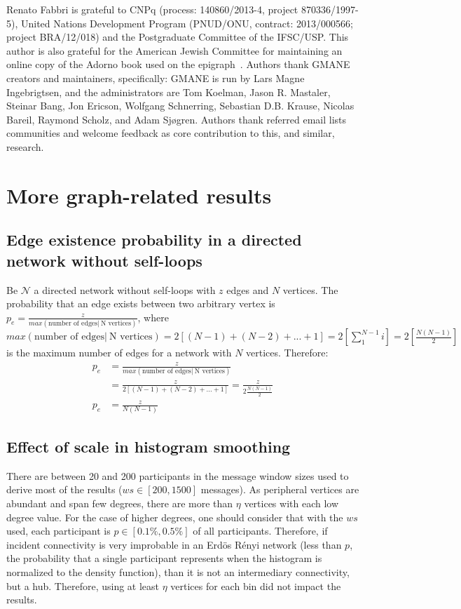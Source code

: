 \documentclass[%
 aip,
 jmp,%
 amsmath,amssymb,
 reprint,%
]{revtex4-1}
\begin{document}
\begin{acknowledgments}
Renato Fabbri is grateful to CNPq (process: 140860/2013-4,
project 870336/1997-5), United Nations Development Program (PNUD/ONU, contract: 2013/000566; project BRA/12/018)  and 
the Postgraduate Committee of the IFSC/USP. This author is also grateful for
the American Jewish Committee for maintaining an online copy of the Adorno book
used on the epigraph~\cite{adorno}. Authors thank GMANE creators and maintainers, specifically: GMANE is run by Lars Magne Ingebrigtsen, and the administrators are Tom Koelman, Jason R. Mastaler, Steinar Bang, Jon Ericson, Wolfgang Schnerring, Sebastian D.B. Krause, Nicolas Bareil, Raymond Scholz, and Adam Sjøgren. Authors thank referred email lists communities and welcome feedback as core contribution to this, and similar, research.
\end{acknowledgments}


\appendix
\section{More graph-related results}
\subsection{Edge existence probability in a directed network without self-loops}\label{ap:ded}
Be $\mathcal{N}$ a directed network without self-loops with $z$ edges and $N$ vertices. The probability that an edge exists between two arbitrary vertex is $p_e=\frac{z}{max( \text{number of edges} |\ \text{N vertices})}$, where $max( \text{number of edges} |\ \text{N vertices})=2[(N-1)+(N-2)+...+1]=2[\sum_1^{N-1}i]=2[\frac{N(N-1)}{2}]$ is the maximum number of edges for a network with $N$ vertices. Therefore:
\begin{align}
    p_e&=\frac{z}{max( \text{number of edges} |\ \text{N vertices})} \nonumber \\
       &=\frac{z}{2[(N-1)+(N-2)+...+1]}=\frac{z}{2\frac{N(N-1)}{2}} \nonumber \\
   p_e &=\frac{z}{N(N-1)}
\end{align}

\subsection{Effect of scale in histogram smoothing}\label{ap:ded}
There are between 20 and 200 participants in the message window sizes used to derive most of the results ($ws \in [200,1500]$ messages). As peripheral vertices are abundant and span few degrees, there are more than $\eta$ vertices with each low degree value. For the case of higher degrees, one should consider that with the $ws$ used, each participant is $p \in [0.1\%,0.5\%]$ of all participants. Therefore, if incident connectivity is very improbable in an Erd\"os R\'enyi network (less than $p$, the probability that a single participant represents when the histogram is normalized to the density function), than it is not an intermediary connectivity, but a hub. Therefore, using at least $\eta$ vertices for each bin did not impact the results.
\end{document}
